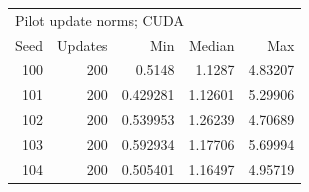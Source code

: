 \begin{tabular}{rrrrr}
\toprule
\multicolumn{5}{l}{Pilot update norms; CUDA} \\
Seed & Updates & Min & Median & Max \\
\midrule
100 & 200 & 0.5148 & 1.1287 & 4.83207 \\
101 & 200 & 0.429281 & 1.12601 & 5.29906 \\
102 & 200 & 0.539953 & 1.26239 & 4.70689 \\
103 & 200 & 0.592934 & 1.17706 & 5.69994 \\
104 & 200 & 0.505401 & 1.16497 & 4.95719 \\
\bottomrule
\end{tabular}
